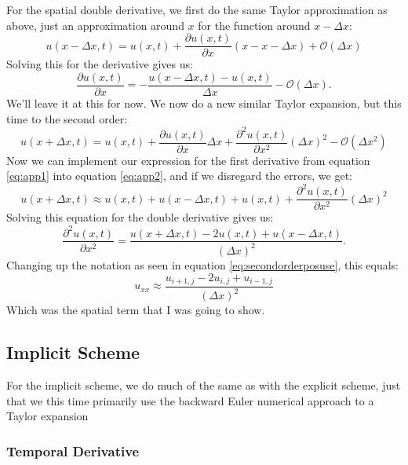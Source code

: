 \documentclass[reprint,english,notitlepage]{revtex4-1}  %
\begin{document}
\begin{appendix}
For the spatial double derivative, we first do the same Taylor approximation as above, just an approximation around $x$ for the function around $x-\Delta x$:
\begin{equation}
    u(x-\Delta x,t) = u(x,t) + \frac{\partial u(x,t)}{\partial x}(x-x-\Delta x) + \mathcal{O}(\Delta x)
\end{equation}
Solving this for the derivative gives us:
\begin{equation}\label{eq:app1}
    \frac{\partial u(x,t)}{\partial x} = -\frac{u(x-\Delta x,t)-u(x,t)}{\Delta x} - \mathcal{O}(\Delta x).
\end{equation}
We'll leave it at this for now. We now do a new similar Taylor expansion, but this time to the second order:
\begin{equation}\label{eq:app2}
    u(x+\Delta x,t) = u(x,t) + \frac{\partial u(x,t)}{\partial x}\Delta x + \frac{\partial^2 u(x,t)}{\partial x^2}(\Delta x)^2 - \mathcal{O}(\Delta x^2)
\end{equation}
Now we can implement our expression for the first derivative from equation \ref{eq:app1} into equation \ref{eq:app2}, and if we disregard the errors, we get:
\begin{equation}
    u(x+\Delta x,t) \approx u(x,t) + u(x-\Delta x,t) + u(x,t) + \frac{\partial^2 u(x,t)}{\partial x^2}(\Delta x)^2  
\end{equation}
Solving this equation for the double derivative gives us:
\begin{equation}
    \frac{\partial^2 u(x,t)}{\partial x^2} = \frac{u(x+\Delta x,t) - 2u(x,t) + u(x-\Delta x,t)}{(\Delta x)^2}.
\end{equation}
Changing up the notation as seen in equation \ref{eq:secondorderposuse}, this equals:
\begin{equation}
    u_{xx} \approx \frac{u_{i+1,j} - 2u_{i,j} + u_{i-1,j}}{(\Delta x)^2}
\end{equation}
Which was the spatial term that I was going to show.

\subsection{Implicit Scheme}

For the implicit scheme, we do much of the same as with the explicit scheme, just that we this time primarily use the backward Euler numerical approach to a Taylor expansion

\subsubsection{Temporal Derivative}


\end{appendix}
\end{document}
